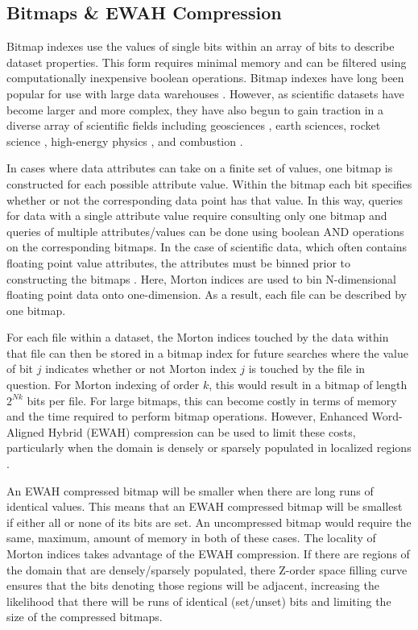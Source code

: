 \documentclass[apjl]{emulateapj}
\begin{document}
\subsection{Bitmaps \& EWAH Compression}
Bitmap indexes use the values of single bits within an array of bits to describe dataset properties. This form requires minimal memory and can be filtered using computationally inexpensive boolean operations. Bitmap indexes have long been popular for use with large data warehouses \citep{Wu1998,Chan1998,Chan1999}. However, as scientific datasets have become larger and more complex, they have also begun to gain traction in a diverse array of scientific fields including geosciences \citep{Malensek2014}, earth sciences, rocket science \citep{Sinha2006,Sinha2007}, high-energy physics \citep{Stockinger2000}, and combustion \citep{Wu2003}. 

In cases where data attributes can take on a finite set of values, one bitmap is constructed for each possible attribute value. Within the bitmap each bit specifies whether or not the corresponding data point has that value. In this way, queries for data with a single attribute value require consulting only one bitmap and queries of multiple attributes/values can be done using boolean AND operations on the corresponding bitmaps. In the case of scientific data, which often contains floating point value attributes, the attributes must be binned prior to constructing the bitmaps \citep{Yu1998,Shoshani1999,Stockinger2004}. Here, Morton indices are used to bin N-dimensional floating point data onto one-dimension. As a result, each file can be described by one bitmap.

For each file within a dataset, the Morton indices touched by the data within that file can then be stored in a bitmap index for future searches where the value of bit $j$ indicates whether or not Morton index $j$ is touched by the file in question. For Morton indexing of order $k$, this would result in a bitmap of length $2^{Nk}$ bits per file. For large bitmaps, this can become costly in terms of memory and the time required to perform bitmap operations. However, Enhanced Word-Aligned Hybrid (EWAH) compression can be used to limit these costs, particularly when the domain is densely or sparsely populated in localized regions \citep{Wu2001,Lemire2010,Kaser2016}. 

An EWAH compressed bitmap will be smaller when there are long runs of identical values. This means that an EWAH compressed bitmap will be smallest if either all or none of its bits are set. An uncompressed bitmap would require the same, maximum, amount of memory in both of these cases. The locality of Morton indices takes advantage of the EWAH compression. If there are regions of the domain that are densely/sparsely populated, there Z-order space filling curve ensures that the bits denoting those regions will be adjacent, increasing the likelihood that there will be runs of identical (set/unset) bits and limiting the size of the compressed bitmaps.
\end{document}
